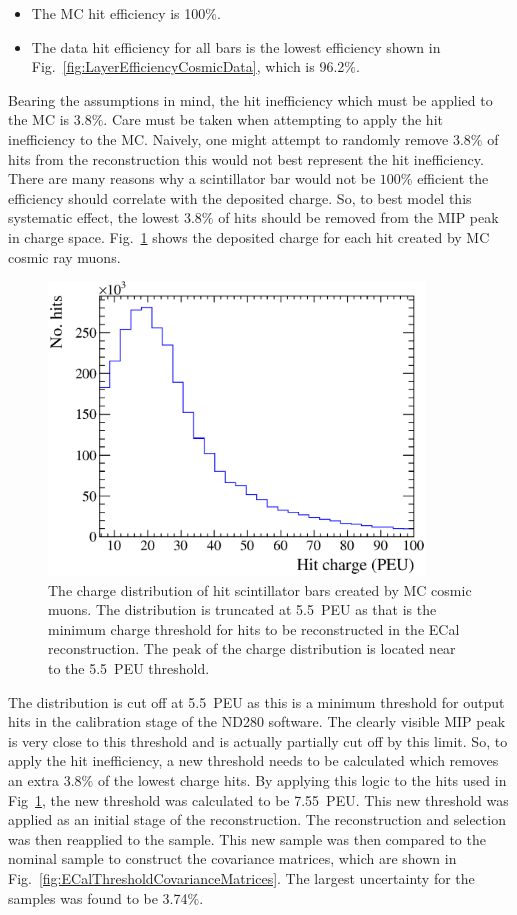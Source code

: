 \begin{itemize}
\item The MC hit efficiency is 100$\%$.
\item The data hit efficiency for all bars is the lowest efficiency shown in Fig.~\ref{fig:LayerEfficiencyCosmicData}, which is 96.2$\%$.
\end{itemize}
Bearing the assumptions in mind, the hit inefficiency which must be applied to the MC is 3.8$\%$.  Care must be taken when attempting to apply the hit inefficiency to the MC.  Naively, one might attempt to randomly remove 3.8$\%$ of hits from the reconstruction this would not best represent the hit inefficiency.  There are many reasons why a scintillator bar would not be $100\%$ efficient the efficiency should correlate with the deposited charge.  So, to best model this systematic effect, the lowest 3.8$\%$ of hits should be removed from the MIP peak in charge space.  Fig.~\ref{fig:HitChargeCosmicMCPEU} shows the deposited charge for each hit created by MC cosmic ray muons.
\begin{figure}[b!]
  \centering
  \includegraphics[width=10cm]{images/measurement/systematics/detector/threshold/hit_charge_cosmic_MC_PEU.eps}
  \caption{The charge distribution of hit scintillator bars created by MC cosmic muons.  The distribution is truncated at 5.5~PEU as that is the minimum charge threshold for hits to be reconstructed in the ECal reconstruction.  The peak of the charge distribution is located near to the 5.5~PEU threshold.}
  \label{fig:HitChargeCosmicMCPEU}
\end{figure}
The distribution is cut off at 5.5~PEU as this is a minimum threshold for output hits in the calibration stage of the ND280 software.  The clearly visible MIP peak is very close to this threshold and is actually partially cut off by this limit.  So, to apply the hit inefficiency, a new threshold needs to be calculated which removes an extra 3.8$\%$ of the lowest charge hits.  By applying this logic to the hits used in Fig~\ref{fig:HitChargeCosmicMCPEU}, the new threshold was calculated to be 7.55~PEU.  This new threshold was applied as an initial stage of the reconstruction.  The reconstruction and selection was then reapplied to the sample.  This new sample was then compared to the nominal sample to construct the covariance matrices, which are shown in Fig.~\ref{fig:ECalThresholdCovarianceMatrices}.  The largest uncertainty for the samples was found to be 3.74$\%$.
